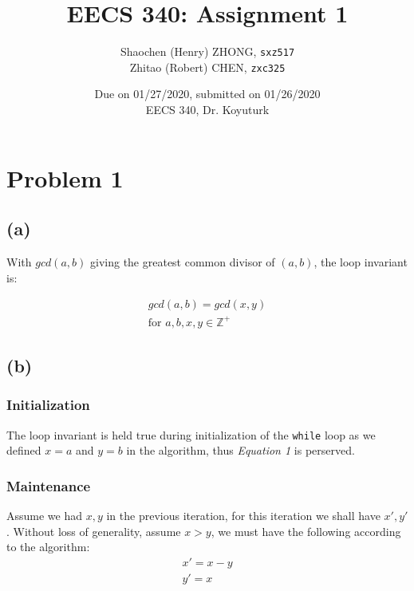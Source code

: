 \documentclass[12pt]{article}
\newcommand{\inlinecode}{\texttt}
\begin{document}
\title{\textbf{EECS 340: Assignment 1}}

\author{Shaochen (Henry) ZHONG, \inlinecode{sxz517} \\ Zhitao (Robert) CHEN, \inlinecode{zxc325}}
\date{Due on 01/27/2020, submitted on 01/26/2020 \\ EECS 340, Dr. Koyuturk}
\maketitle

\section{Problem 1}
\subsection{(a)}
With $gcd(a, b)$ giving the greatest common divisor of $(a, b)$, the loop invariant is:

\begin{gather}
    gcd(a, b) = gcd(x, y) \\
    \text{for $a, b, x, y \in \mathbb{Z^+}$}\nonumber
\end{gather}




\subsection{(b)}
\subsubsection{Initialization}

The loop invariant is held true during initialization of the \inlinecode{while} loop as we defined $x = a$ and $y = b$ in the algorithm, thus \textit{Equation 1} is perserved.

\subsubsection{Maintenance}

Assume we had $x, y$ in the previous iteration, for this iteration we shall have $x', y'$. Without loss of generality, assume $x > y$, we must have the following according to the algorithm:
\begin{gather}
    x' = x - y \nonumber\\
    y' = x \nonumber
\end{gather}
\end{document}
